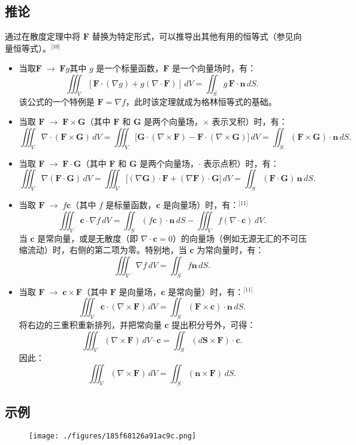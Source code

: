 \subsection{推论}
通过在散度定理中将 $\mathbf{F}$ 替换为特定形式，可以推导出其他有用的恒等式（参见向量恒等式）。\(^\text{[10]}\)
\begin{itemize}
\item 当取$\mathbf{F} \;\rightarrow\; \mathbf{F}g$其中 $g$ 是一个标量函数，$\mathbf{F}$ 是一个向量场时，有：
$$
\iiint_{V} \left[\mathbf{F} \cdot (\nabla g) + g (\nabla \cdot \mathbf{F}) \right] \, dV
=\iint_{S} g\,\mathbf{F} \cdot \mathbf{n} \, dS .~
$$
该公式的一个特例是 $\mathbf{F} = \nabla f$，此时该定理就成为格林恒等式的基础。
\item 当取 $\mathbf{F} \;\rightarrow\; \mathbf{F} \times \mathbf{G}$（其中 $\mathbf{F}$ 和 $\mathbf{G}$ 是两个向量场，$\times$ 表示叉积）时，有：
$$
\iiint_{V} \nabla \cdot (\mathbf{F} \times \mathbf{G}) \, dV
= \iiint_{V} \big[ \mathbf{G} \cdot (\nabla \times \mathbf{F}) - \mathbf{F} \cdot (\nabla \times \mathbf{G}) \big] \, dV
= \iint_{S} (\mathbf{F} \times \mathbf{G}) \cdot \mathbf{n} \, dS .~
$$
\item 当取 $\mathbf{F} \;\rightarrow\; \mathbf{F} \cdot \mathbf{G}$（其中 $\mathbf{F}$ 和 $\mathbf{G}$ 是两个向量场，$\cdot$ 表示点积）时，有：
$$
\iiint_{V} \nabla (\mathbf{F} \cdot \mathbf{G}) \, dV
= \iiint_{V} \big[ (\nabla \mathbf{G}) \cdot \mathbf{F} + (\nabla \mathbf{F}) \cdot \mathbf{G} \big] \, dV
= \iint_{S} (\mathbf{F} \cdot \mathbf{G}) \, \mathbf{n} \, dS.~
$$
\item 当取 $\mathbf{F} \;\rightarrow\; f\mathbf{c}$（其中 $f$ 是标量函数，$\mathbf{c}$ 是向量场）时，有：\(^\text{[11]}\)
$$
\iiint_{V} \mathbf{c} \cdot \nabla f \, dV
= \iint_{S} (f \mathbf{c}) \cdot \mathbf{n} \, dS
- \iiint_{V} f (\nabla \cdot \mathbf{c}) \, dV.~
$$
当 $\mathbf{c}$ 是常向量，或是无散度（即 $\nabla \cdot \mathbf{c} = 0$）的向量场（例如无源无汇的不可压缩流动）时，右侧的第二项为零。特别地，当 $\mathbf{c}$ 为常向量时，有：
$$
\iiint_{V} \nabla f \, dV
= \iint_{S} f \mathbf{n} \, dS.~
$$
\item 当取 $\mathbf{F} \;\rightarrow\; \mathbf{c} \times \mathbf{F}$（其中 $\mathbf{F}$ 是向量场，$\mathbf{c}$ 是常向量）时，有：\(^\text{[11]}\)
$$
\iiint_{V} \mathbf{c} \cdot (\nabla \times \mathbf{F}) \, dV
= \iint_{S} (\mathbf{F} \times \mathbf{c}) \cdot \mathbf{n} \, dS.~
$$
将右边的三重积重新排列，并把常向量 $\mathbf{c}$ 提出积分号外，可得：
$$
\iiint_{V} (\nabla \times \mathbf{F}) \, dV \cdot \mathbf{c}
= \iint_{S} (d\mathbf{S} \times \mathbf{F}) \cdot \mathbf{c}.~
$$
因此：
$$
\iiint_{V} (\nabla \times \mathbf{F}) \, dV
= \iint_{S} (\mathbf{n} \times \mathbf{F}) \, dS.~
$$
\end{itemize}
\subsection{示例}
\begin{figure}[ht]
\centering
\texttt{[image: ./figures/185f68126a91ac9c.png]}
\caption{} \label{fig_GSsd_5}
\end{figure}